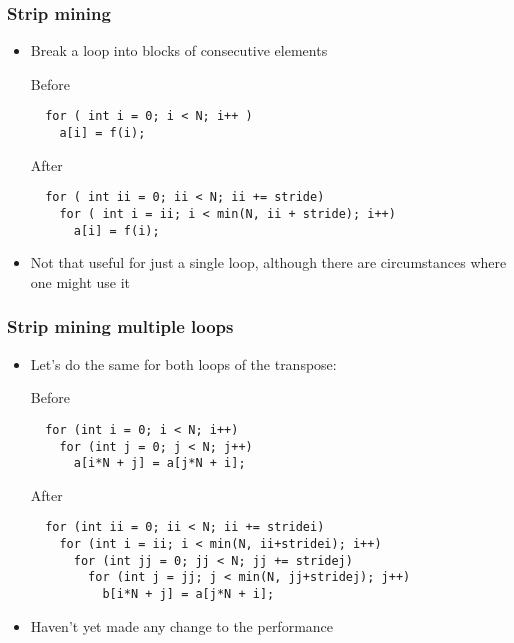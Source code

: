 \documentclass[presentation,aspectratio=43,10pt]{beamer}
\begin{document}
\begin{frame}[fragile]
  \frametitle{Strip mining}
  \begin{itemize}
  \item Break a loop into blocks of consecutive elements
    \begin{challenge}{Before}
\begin{verbatim}
  for ( int i = 0; i < N; i++ )
    a[i] = f(i);
\end{verbatim}
    \end{challenge}
    \begin{answer}{After}
\begin{verbatim}
  for ( int ii = 0; ii < N; ii += stride)
    for ( int i = ii; i < min(N, ii + stride); i++)
      a[i] = f(i);
\end{verbatim}
    \end{answer}
  \item Not that useful for just a single loop, although there are
    circumstances where one might use it
  \end{itemize}
\end{frame}

\begin{frame}[fragile]
  \frametitle{Strip mining multiple loops}
  \begin{itemize}
  \item Let's do the same for both loops of the transpose:
    \begin{challenge}{Before}
\begin{verbatim}
  for (int i = 0; i < N; i++)
    for (int j = 0; j < N; j++)
      a[i*N + j] = a[j*N + i];
\end{verbatim}
    \end{challenge}

    \begin{answer}{After}
\begin{verbatim}
  for (int ii = 0; ii < N; ii += stridei)
    for (int i = ii; i < min(N, ii+stridei); i++)
      for (int jj = 0; jj < N; jj += stridej)
        for (int j = jj; j < min(N, jj+stridej); j++)
          b[i*N + j] = a[j*N + i];
\end{verbatim}
    \end{answer}
  \item Haven't yet made any change to the performance
  \end{itemize}
\end{frame}
\end{document}
